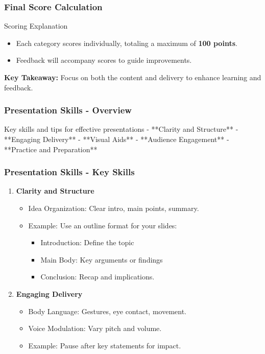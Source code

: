 \documentclass[aspectratio=169]{beamer}
\begin{document}
\begin{frame}[fragile]
    \frametitle{Final Score Calculation}
    \begin{block}{Scoring Explanation}
        \begin{itemize}
            \item Each category scores individually, totaling a maximum of \textbf{100 points}.
            \item Feedback will accompany scores to guide improvements.
        \end{itemize}
        \textbf{Key Takeaway:} Focus on both the content and delivery to enhance learning and feedback.
    \end{block}
\end{frame}

\begin{frame}[fragile]
    \frametitle{Presentation Skills - Overview}
    \begin{block}{Key skills and tips for effective presentations}
        - **Clarity and Structure**
        - **Engaging Delivery**
        - **Visual Aids**
        - **Audience Engagement**
        - **Practice and Preparation**
    \end{block}
\end{frame}

\begin{frame}[fragile]
    \frametitle{Presentation Skills - Key Skills}
    \begin{enumerate}
        \item \textbf{Clarity and Structure}
            \begin{itemize}
                \item Idea Organization: Clear intro, main points, summary.
                \item Example: Use an outline format for your slides:
                \begin{itemize}
                    \item Introduction: Define the topic
                    \item Main Body: Key arguments or findings
                    \item Conclusion: Recap and implications.
                \end{itemize}
            \end{itemize}
        
        \item \textbf{Engaging Delivery}
            \begin{itemize}
                \item Body Language: Gestures, eye contact, movement.
                \item Voice Modulation: Vary pitch and volume.
                \item Example: Pause after key statements for impact.
            \end{itemize}
    \end{enumerate}
\end{frame}
\end{document}
